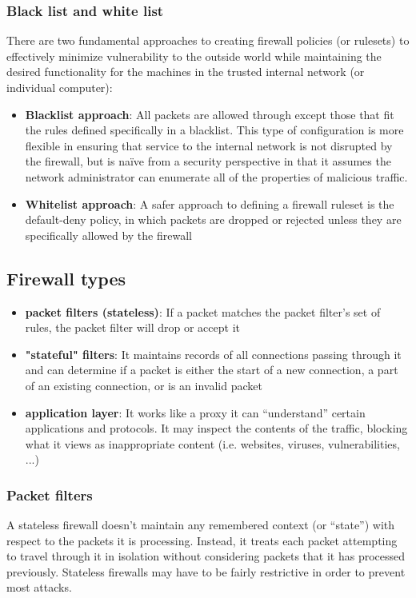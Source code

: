 \subsubsection{Black list and white list}
There are two fundamental approaches to creating firewall policies (or rulesets) to effectively minimize vulnerability to the outside world while maintaining the desired functionality for the machines in the trusted
internal network (or individual computer):
\begin{itemize}
\item \textbf{Blacklist approach}: All packets are allowed through except those that fit the rules defined
specifically in a blacklist. This type of configuration is more flexible in ensuring that service to the internal network is not disrupted by the firewall, but is naïve from a security perspective in that it assumes the network administrator can enumerate all of the properties of malicious traffic.
\item \textbf{Whitelist approach}: A safer approach to defining a firewall ruleset is the default-deny policy, in which packets are dropped or rejected unless they are specifically allowed by the firewall
\end{itemize}
\subsection{Firewall types}
\begin{itemize}
\item \textbf{packet filters (stateless)}: If a packet matches the packet filter's set of rules, the packet filter will drop or accept it 
\item \textbf{"stateful" filters}: It maintains records of all connections passing through it and can determine if a packet is either the start of a new connection, a part of an existing connection, or is an invalid packet
\item \textbf{application layer}: It works like a proxy it can “understand” certain applications and protocols. It may inspect the contents of the traffic, blocking what it views as inappropriate content (i.e. websites, viruses, vulnerabilities, ...)
\end{itemize}
\subsubsection{Packet filters}
A stateless firewall doesn’t maintain any remembered context (or “state”) with respect to the packets it is processing. Instead, it treats each packet attempting to travel through it in isolation without considering packets that it has processed previously. Stateless firewalls may have to be fairly restrictive in order to prevent most attacks.
